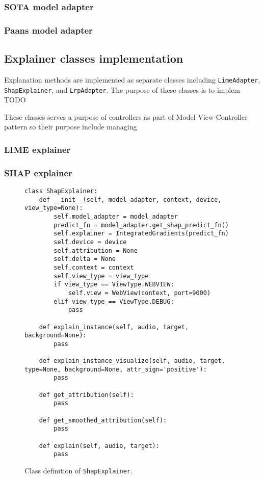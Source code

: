 \documentclass[
    bindingoffset=5mm,  %
    footnoteindent=3mm, %
    hyphenation=true    %
]{src/wut-thesis}
\begin{document}
\subsubsection{SOTA model adapter}
\subsubsection{Paans model adapter}

\subsection{Explainer classes implementation}

Explanation methods are implemented as separate classes including \texttt{LimeAdapter}, \texttt{ShapExplainer}, and \texttt{LrpAdapter}.
The purpose of these classes is to implem TODO

These classes serves a purpose of controllers as part of Model-View-Controller pattern so their purpose include managing 


\subsubsection{LIME explainer}
\subsubsection{SHAP explainer}
\begin{figure}%
\begin{verbatim}
class ShapExplainer:
    def __init__(self, model_adapter, context, device, view_type=None):
        self.model_adapter = model_adapter
        predict_fn = model_adapter.get_shap_predict_fn()
        self.explainer = IntegratedGradients(predict_fn)
        self.device = device
        self.attribution = None
        self.delta = None
        self.context = context
        self.view_type = view_type
        if view_type == ViewType.WEBVIEW:
            self.view = WebView(context, port=9000)
        elif view_type == ViewType.DEBUG:
            pass

    def explain_instance(self, audio, target, background=None):
        pass
    
    def explain_instance_visualize(self, audio, target, type=None, background=None, attr_sign='positive'):
        pass

    def get_attribution(self):
        pass

    def get_smoothed_attribution(self):
        pass
    
    def explain(self, audio, target):
        pass
\end{verbatim}
\caption{Class definition of \texttt{ShapExplainer}.}
\label{fig:ShapExplainer}
\end{figure}
\end{document}
